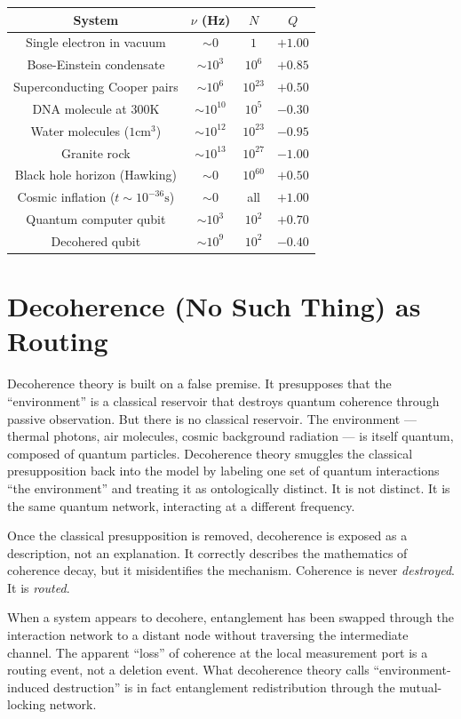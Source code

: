 \documentclass[12pt]{article}
\begin{document}
\begin{center}
\begin{tabular}{c|c|c|c}
System & $\nu$ (Hz) & $N$ & $Q$ \\
\hline
Single electron in vacuum & $\sim 0$ & $1$ & $+1.00$ \\
Bose-Einstein condensate & $\sim 10^3$ & $10^6$ & $+0.85$ \\
Superconducting Cooper pairs & $\sim 10^6$ & $10^{23}$ & $+0.50$ \\
DNA molecule at $300\text{K}$ & $\sim 10^{10}$ & $10^5$ & $-0.30$ \\
Water molecules ($1\text{cm}^3$) & $\sim 10^{12}$ & $10^{23}$ & $-0.95$ \\
Granite rock & $\sim 10^{13}$ & $10^{27}$ & $-1.00$ \\
Black hole horizon (Hawking) & $\sim 0$ & $10^{60}$ & $+0.50$ \\
Cosmic inflation ($t \sim 10^{-36}\text{s}$) & $\sim 0$ & all & $+1.00$ \\
Quantum computer qubit & $\sim 10^3$ & $10^2$ & $+0.70$ \\
Decohered qubit & $\sim 10^9$ & $10^2$ & $-0.40$ \\
\end{tabular}
\end{center}

\section{Decoherence (No Such Thing) as Routing}

Decoherence theory is built on a false premise. It presupposes that the ``environment'' is a classical reservoir that destroys quantum coherence through passive observation. But there is no classical reservoir. The environment — thermal photons, air molecules, cosmic background radiation — is itself quantum, composed of quantum particles. Decoherence theory smuggles the classical presupposition back into the model by labeling one set of quantum interactions ``the environment'' and treating it as ontologically distinct. It is not distinct. It is the same quantum network, interacting at a different frequency.

Once the classical presupposition is removed, decoherence is exposed as a description, not an explanation. It correctly describes the mathematics of coherence decay, but it misidentifies the mechanism. Coherence is never \textit{destroyed}. It is \textit{routed}.

When a system appears to decohere, entanglement has been swapped through the interaction network to a distant node without traversing the intermediate channel. The apparent ``loss'' of coherence at the local measurement port is a routing event, not a deletion event. What decoherence theory calls ``environment-induced destruction'' is in fact entanglement redistribution through the mutual-locking network.
\end{document}
